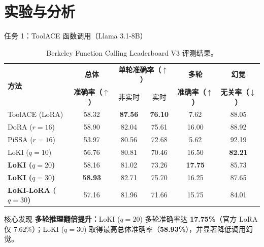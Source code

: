 \documentclass{beamer}
\begin{document}
\section{实验与分析}

    \begin{frame}{任务 1：ToolACE 函数调用（Llama 3.1-8B）}
        \begin{table}
            \centering
            \scriptsize
            \setlength{\tabcolsep}{5pt}
            \begin{tabular}{l|c|cc|cc}
                \toprule
                \multirow{2}{*}{\textbf{方法}} & \textbf{总体} & \multicolumn{2}{c|}{\textbf{单轮准确率（$\uparrow$）}} & \textbf{多轮} & \textbf{幻觉} \\
                 & \textbf{准确率（$\uparrow$）} & 非实时 & 实时 & \textbf{准确率（$\uparrow$）} & \textbf{无关率（$\downarrow$）} \\
                \midrule
                ToolACE (LoRA)\cite{hu2022lora} & 58.32 & \textbf{87.56} & \textbf{76.10} & 7.62 & 88.05 \\
                DoRA ($r=16$) \cite{liu2024dora}& 58.90 & 82.04 & 75.61 & 16.00 & 88.92 \\
                PiSSA ($r=16$) \cite{meng2024pissa}& 53.97 & 80.56 & 72.68 & 5.62 & 92.19 \\
                \midrule
                LoKI ($q=10$) & 56.76 & 80.81 & 70.46 & 16.50 & \textbf{82.21} \\
                \textbf{LoKI ($q=20$)} & 58.16 & 81.02 & 73.26 & \alert{\textbf{17.75}} & 85.73 \\
                \textbf{LoKI ($q=30$)} & \alert{\textbf{58.93}} & 82.71 & 75.70 & 16.25 & 87.65 \\
                \textbf{LoKI-LoRA ($q=30$)} & 57.16 & 81.96 & 71.66 & 15.75 & 84.01 \\
                \bottomrule
            \end{tabular}
            \caption{Berkeley Function Calling Leaderboard V3 评测结果。}
        \end{table}
        \vspace{-0.2em}
        \begin{alertblock}{核心发现}
            \small\textbf{多轮推理翻倍提升：}LoKI ($q=20$) 多轮准确率达 \textbf{17.75\%}（官方 LoRA 仅 7.62\%）；LoKI ($q=30$) 取得最高总体准确率（\textbf{58.93\%}），并显著降低调用幻觉。
        \end{alertblock}
    \end{frame}
\end{document}
